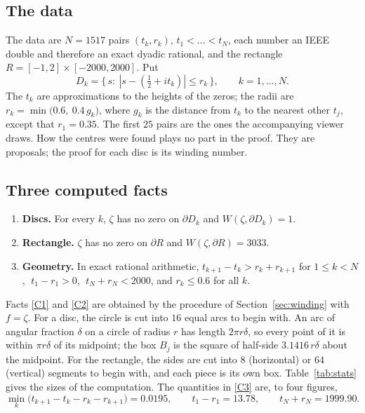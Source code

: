 \documentclass[11pt,a4paper]{article}
\theoremstyle{definition}
\begin{document}
\subsection{The data}

The data are $N=1517$ pairs $(t_k,r_k)$, $t_1<\dots<t_N$, each number an
IEEE double and therefore an exact dyadic rational, and the rectangle
$R=[-1,2]\times[-2000,2000]$. Put
\[
  D_k=\{\,s:\ |s-(\tfrac12+it_k)|\le r_k\,\},\qquad k=1,\dots,N .
\]
The $t_k$ are approximations to the heights of the zeros; the radii are
$r_k=\min\big(0.6,\ 0.4\,g_k\big)$, where $g_k$ is the distance from $t_k$ to
the nearest other $t_j$, except that $r_1=0.35$. The first $25$ pairs are the
ones the accompanying viewer draws. How the centres were found plays no part
in the proof. They are proposals; the proof for each disc is its winding
number.

\subsection{Three computed facts}

\begin{enumerate}[label=\textbf{(C\arabic*)},leftmargin=3em]
\item\label{C1} \textbf{Discs.} For every $k$, $\zeta$ has no zero on
  $\partial D_k$ and $W(\zeta,\partial D_k)=1$.
\item\label{C2} \textbf{Rectangle.} $\zeta$ has no zero on $\partial R$ and
  $W(\zeta,\partial R)=3033$.
\item\label{C3} \textbf{Geometry.} In exact rational arithmetic,
  $t_{k+1}-t_k>r_k+r_{k+1}$ for $1\le k<N$, $\;t_1-r_1>0$,
  $\;t_N+r_N<2000$, and $r_k\le 0.6$ for all $k$.
\end{enumerate}

Facts \ref{C1} and \ref{C2} are obtained by the procedure of
Section~\ref{sec:winding} with $f=\zeta$. For a disc, the circle is cut into
$16$ equal arcs to begin with. An arc of angular fraction $\delta$ on a circle
of radius $r$ has length $2\pi r\delta$, so every point of it is within
$\pi r\delta$ of its midpoint; the box $B_j$ is the square of half-side
$3.1416\,r\delta$ about the midpoint. For the rectangle, the sides are cut into
$8$ (horizontal) or $64$ (vertical) segments to begin with, and each piece is
its own box. Table~\ref{tab:stats} gives the sizes of the computation. The
quantities in \ref{C3} are, to four figures,
\[
  \min_k\big(t_{k+1}-t_k-r_k-r_{k+1}\big)=0.0195,\qquad
  t_1-r_1=13.78,\qquad t_N+r_N=1999.90 .
\]
\end{document}
